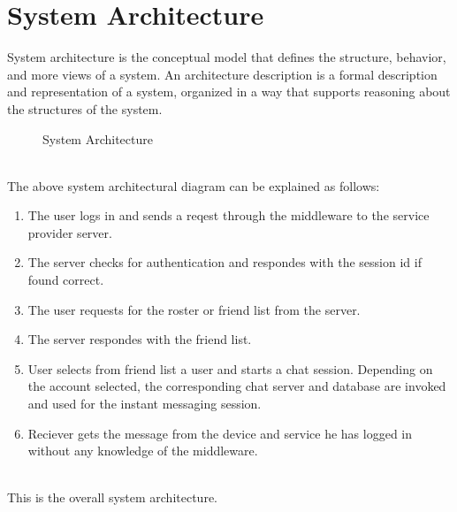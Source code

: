 \documentclass{SureshLimkar}
\begin{document}
\section{System Architecture}
\hspace{0.5 in}System architecture is the conceptual model that defines the structure, behavior, and more views of a system. An architecture description is a formal description and representation of a system, organized in a way that supports reasoning about the structures of the system.
\\
\begin{figure}[h]%
\centering
\caption{System Architecture}%
\label{MUC client server architecture}%
\end{figure}
\\
\hspace{0.5 in} The above system architectural diagram can be explained as follows:
\begin{enumerate}
 \item The user logs in and sends a reqest through the middleware to the service provider server. 
 \item The server checks for authentication and respondes with the session id if found correct.
 \item The user requests for the roster or friend list from the server.
 \item The server respondes with the friend list.
 \item User selects from friend list a user and starts a chat session. Depending on the account selected, the corresponding chat server and database are invoked and used for the instant messaging session.
 \item Reciever gets the message from the device and service he has logged in without any knowledge of the middleware.
\end{enumerate}
\\
\hspace{0.5 in} This is the overall system architecture.
\\
\newpage
\end{document}
